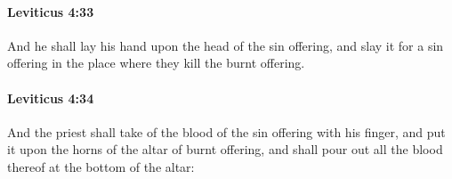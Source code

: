 		\paragraph{Leviticus 4:33} %
			\label{LEVITICUS-4-33}

			And he shall lay his hand upon the head of the sin offering, and slay it for a sin offering in the place where they kill the burnt offering.


		\paragraph{Leviticus 4:34} %
			\label{LEVITICUS-4-34}

			And the priest shall take of the blood of the sin offering with his finger, and put it upon the horns of the altar of burnt offering, and shall pour out all the blood thereof at the bottom of the altar:


